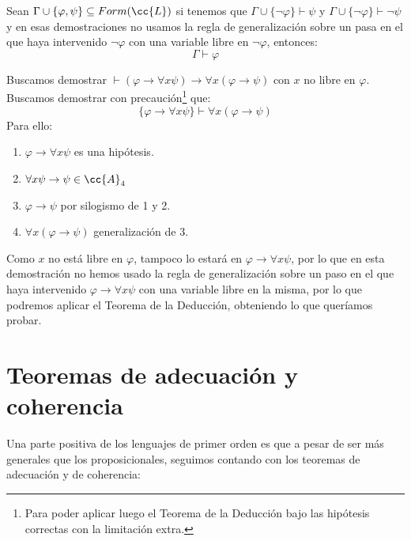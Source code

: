 \begin{teo}
    Sean $\Gamma\cup\{\varphi,\psi\}\subseteq Form(\cc{L})$ si tenemos que $\Gamma\cup\{\lnot\varphi\}\vdash \psi$ y $\Gamma\cup\{\lnot\varphi\}\vdash \lnot\psi$ y en esas demostraciones no usamos la regla de generalización sobre un pasa en el que haya intervenido $\lnot\varphi$ con una variable libre en $\lnot\varphi$, entonces:
    \begin{equation*}
        \Gamma\vdash \varphi
    \end{equation*}
\end{teo}

\begin{ejemplo}
    Buscamos demostrar $\vdash (\varphi \to \forall x\psi)\to \forall x(\varphi\to \psi)$ con $x$ no libre en $\varphi$.\\

        Buscamos demostrar con precaución\footnote{Para poder aplicar luego el Teorema de la Deducción bajo las hipótesis correctas con la limitación extra.} que:
        \begin{equation*}
            \{\varphi \to \forall x\psi\} \vdash \forall x(\varphi\to \psi)
        \end{equation*}
        Para ello:
        \begin{enumerate}
            \item $\varphi \to \forall x\psi$ es una hipótesis.
            \item $\forall x\psi\to \psi \in \cc{A}_4$
            \item $\varphi\to \psi$ por silogismo de 1 y 2.
            \item $\forall x(\varphi\to \psi)$ generalización de $3$.
        \end{enumerate}

        Como $x$ no está libre en $\varphi$, tampoco lo estará en $\varphi\to\forall x\psi$, por lo que en esta demostración no hemos usado la regla de generalización sobre un paso en el que haya intervenido $\varphi\to\forall x\psi$ con una variable libre en la misma, por lo que podremos aplicar el Teorema de la Deducción, obteniendo lo que queríamos probar.
\end{ejemplo}

\section{Teoremas de adecuación y coherencia}
Una parte positiva de los lenguajes de primer orden es que a pesar de ser más generales que los proposicionales, seguimos contando con los teoremas de adecuación y de coherencia:

